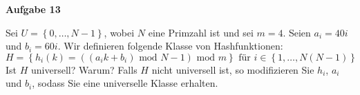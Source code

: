 \documentclass{article}
\begin{document}
\medskip%

{\bfseries Aufgabe 13}%

Sei $U = \left\{ 0, \ldots, N - 1 \right\}$, wobei $N$ eine Primzahl ist und sei
$m = 4$. Seien $a_i = 40i$ und $b_i = 60i$. Wir definieren folgende Klasse von
Hashfunktionen:
\begin{equation}
  H = \left\{ h_i \left( k \right) = \left( \left( a_ik + b_i \right)\text{ mod }N - 1 \right)\text{ mod }m \right\}
  \text{ f{\"u}r } i \in \left\{ 1, \ldots, N \left( N - 1 \right) \right\}
\end{equation}
Ist $H$ universell? Warum? Falls $H$ nicht universell ist, so modifizieren Sie
$h_i$, $a_i$ und $b_i$, sodass Sie eine universelle Klasse erhalten.

\medskip%
\end{document}
